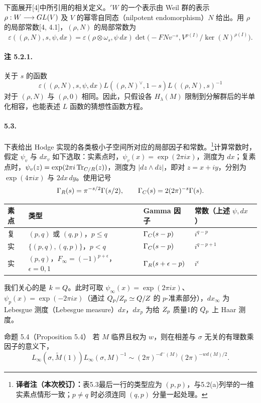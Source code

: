下面展开[4]中所引用的相关定义。${}'W$ 的一个表示由 Weil 群的表示 $\rho:W\longrightarrow GL(V)$ 及 $V$ 的幂零自同态（nilpotent endomorphism）$N$ 给出。用 $\rho$ 的局部常数[4, 4.1]，$(\rho,N)$ 的局部常数为
\[
 \varepsilon((\rho,N),s,\psi,dx)
 =\varepsilon(\rho\otimes\omega_s,\psi\,dx)
 \det\bigl(-FNv^{-s},V^{\rho(I)}/\ker(N)^{\rho(I)}\bigr).
\]

\paragraph*{注 5.2.1.}
关于 $s$ 的函数
\[
 \varepsilon((\rho,N),s,\psi,dx)
 L((\rho,N)^\vee,1-s)L((\rho,N),s)^{-1}
\]
对于 $(\rho,N)$ 与 $(\rho,0)$ 相同。因此，只假设各 $H_\lambda(M)$ 限制到分解群后的半单化相容，也能表述 $L$ 函数的猜想性函数方程。

\paragraph*{5.3.}
下表给出 Hodge 实现的各类极小子空间所对应的局部因子和常数。\footnote{\textbf{译者注（本次校订）：}表5.3最后一行的类型应为 $(p,p)$，与5.2(a)列举的一维实素点情形一致；$p\ne q$ 时必须连同 $(q,p)$ 分量一起处理。}计算常数时，假定 $\psi_v$ 与 $dx_v$ 如下选取：实素点时，$\psi_v(x)=\exp(2\pi ix)$，测度为 $dx$；复素点时，$\psi_v(z)=\exp(2\pi i\operatorname{Tr}_{C/R}(z))$，测度为 $|dz\wedge d\overline z|$，即对 $z=x+iy$，分别为 $\exp(4\pi ix)$ 与 $2dx\,dy$。使用记号
\[
 \Gamma_R(s)=\pi^{-s/2}\Gamma(s/2),\qquad
 \Gamma_C(s)=2(2\pi)^{-s}\Gamma(s).
\]
\begin{center}\small
\begin{tabular}{llll}
\toprule
素点 & 类型 & Gamma 因子 & 常数（上述 $\psi,dx$）\\
\midrule
复 & $(p,q)$ 或 $(q,p)$，$p\leq q$ & $\Gamma_C(s-p)$ & $i^{q-p}$\\
实 & $\{(p,q),(q,p)\}$，$p<q$ & $\Gamma_C(s-p)$ & $i^{q-p+1}$\\
实 & $(p,q)$，$F_\infty=(-1)^{p+\epsilon}$，$\epsilon=0,1$ & $\Gamma_R(s+\epsilon-p)$ & $i^\epsilon$\\
\bottomrule
\end{tabular}
\end{center}


我们关心的是 $k=Q$。此时可取 $\psi_\infty(x)=\exp(2\pi ix)$、$\psi_p(x)=\exp(-2\pi ix)$（通过 $Q_p/Z_p\simeq Q/Z$ 的 $p$-准素部分），$dx_\infty$ 为 Lebesgue 测度（Lebesgue measure）$dx$，$dx_p$ 为给 $Z_p$ 质量1的 $Q_p$ 上 Haar 测度。

\begin{originaltheorem}{命题 5.4（Proposition 5.4）}
若 $M$ 临界且权为 $w$，则在相差与 $\sigma$ 无关的有理数乘因子的意义下，
\[
 L_\infty(\sigma,\widetilde M(1))L_\infty(\sigma,M)^{-1}
 \sim(2\pi)^{-d^-(M)}(2\pi)^{-wd(M)/2}.
\]
\end{originaltheorem}

